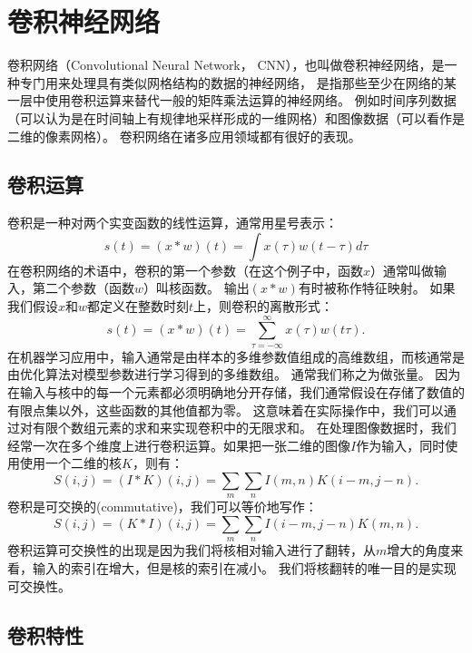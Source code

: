 \section{卷积神经网络}
卷积网络（Convolutional Neural Network， CNN），也叫做卷积神经网络，是一种专门用来处理具有类似网格结构的数据的神经网络，
是指那些至少在网络的某一层中使用卷积运算来替代一般的矩阵乘法运算的神经网络。
例如时间序列数据（可以认为是在时间轴上有规律地采样形成的一维网格）和图像数据（可以看作是二维的像素网格）。
卷积网络在诸多应用领域都有很好的表现。\par

\subsection{卷积运算}
\label{sec:the_convolution_operation}
卷积是一种对两个实变函数的线性运算，通常用星号表示：
\begin{equation}
s(t) = (x*w)(t) = \int x(\tau)w(t-\tau)d\tau
\end{equation}
在卷积网络的术语中，卷积的第一个参数（在这个例子中，函数$x$）通常叫做输入，第二个参数（函数$w$）叫核函数。
输出$ (x*w)$有时被称作特征映射。
如果我们假设$x$和$w$都定义在整数时刻$t$上，则卷积的离散形式：
\begin{equation}
s(t) = (x*w)(t) = \sum_{\tau = -\infty}^{\infty} x(\tau)w(t\tau).
\end{equation}
在机器学习应用中，输入通常是由样本的多维参数值组成的高维数组，而核通常是由优化算法对模型参数进行学习得到的多维数组。
通常我们称之为做张量。
因为在输入与核中的每一个元素都必须明确地分开存储，我们通常假设在存储了数值的有限点集以外，这些函数的其他值都为零。
这意味着在实际操作中，我们可以通过对有限个数组元素的求和来实现卷积中的无限求和。
在处理图像数据时，我们经常一次在多个维度上进行卷积运算。如果把一张二维的图像$I$作为输入，同时使用使用一个二维的核$K$，则有：
\begin{equation}
S(i,j) = (I*K)(i,j) = \sum_m \sum_n I(m,n) K(i-m, j-n).
\end{equation}
卷积是可交换的(commutative)，我们可以等价地写作：
\begin{equation}
S(i, j) = (K*I)(i,j) = \sum_m \sum_n I(i-m, j-n) K(m, n).
\end{equation}
卷积运算可交换性的出现是因为我们将核相对输入进行了翻转，从$m$增大的角度来看，输入的索引在增大，但是核的索引在减小。
我们将核翻转的唯一目的是实现可交换性。\par
\subsection{卷积特性}
